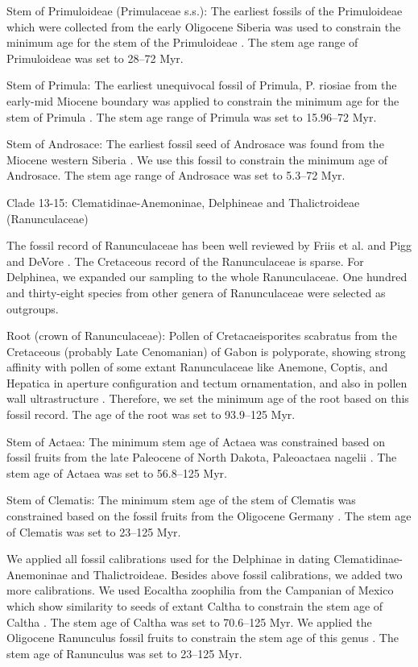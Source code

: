 \documentclass[10pt]{article}
\begin{document}
Stem of Primuloideae (Primulaceae s.s.): The earliest fossils of the
Primuloideae which were collected from the early Oligocene Siberia was
used to constrain the minimum age for the stem of the Primuloideae
\citep{Nikitin2006}. The stem age range of Primuloideae was set to
28--72 Myr.

Stem of Primula: The earliest unequivocal fossil of Primula,
P. riosiae from the early-mid Miocene boundary was applied to
constrain the minimum age for the stem of Primula
\citep{deVos2014}. The stem age range of Primula was set to 15.96--72
Myr.

Stem of Androsace: The earliest fossil seed of Androsace was found
from the Miocene western Siberia \citep{Dorofeev1963}. We use this
fossil to constrain the minimum age of Androsace. The stem age range
of Androsace was set to 5.3--72 Myr.

Clade 13-15: Clematidinae-Anemoninae, Delphineae and Thalictroideae
(Ranunculaceae)

The fossil record of Ranunculaceae has been well reviewed by Friis et
al. \citep{Friis2011} and Pigg and DeVore \citep{Pigg2005}. The
Cretaceous record of the Ranunculaceae is sparse. For Delphinea, we
expanded our sampling to the whole Ranunculaceae. One hundred and
thirty-eight species from other genera of Ranunculaceae were selected
as outgroups.

Root (crown of Ranunculaceae): Pollen of Cretacaeisporites scabratus
from the Cretaceous (probably Late Cenomanian) of Gabon is polyporate,
showing strong affinity with pollen of some extant Ranunculaceae like
Anemone, Coptis, and Hepatica in aperture configuration and tectum
ornamentation, and also in pollen wall ultrastructure
\citep{Ward1994}. Therefore, we set the minimum age of the root based
on this fossil record. The age of the root was set to 93.9--125 Myr.

Stem of Actaea: The minimum stem age of Actaea was constrained based
on fossil fruits from the late Paleocene of North Dakota, Paleoactaea
nagelii \citep{Pigg2005}. The stem age of Actaea was set to 56.8--125
Myr.

Stem of Clematis: The minimum stem age of the stem of Clematis was
constrained based on the fossil fruits from the Oligocene Germany
\citep{Weyland1938}. The stem age of Clematis was set to 23--125 Myr.

We applied all fossil calibrations used for the Delphinae in dating
Clematidinae-Anemoninae and Thalictroideae. Besides above fossil
calibrations, we added two more calibrations. We used Eocaltha
zoophilia from the Campanian of Mexico which show similarity to seeds
of extant Caltha to constrain the stem age of Caltha
\citep{Rodriguez1998}. The stem age of Caltha was set to 70.6--125
Myr. We applied the Oligocene Ranunculus fossil fruits to constrain
the stem age of this genus \citep{Mai1985}. The stem age of Ranunculus
was set to 23--125 Myr.
\end{document}
